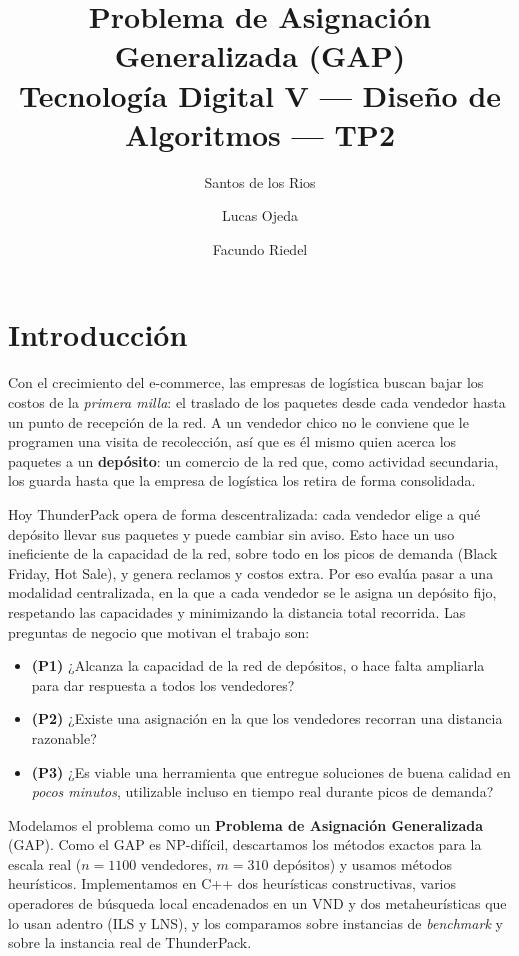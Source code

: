 \documentclass[11pt,a4paper]{article}
\title{\vspace{-1.2cm}\textbf{Problema de Asignación Generalizada (GAP)}\\[6pt]
       \normalsize Tecnología Digital V --- Diseño de Algoritmos --- TP2}
\author{Santos de los Rios \and Lucas Ojeda \and Facundo Riedel}
\date{}
\begin{document}
\maketitle
\vspace{-0.7cm}


\section{Introducción}
Con el crecimiento del e-commerce, las empresas de logística buscan bajar los costos de la
\emph{primera milla}: el traslado de los paquetes desde cada vendedor hasta un punto de recepción
de la red. A un vendedor chico no le conviene que le programen una visita de recolección, así que
es él mismo quien acerca los paquetes a un \textbf{depósito}: un comercio de la red que, como
actividad secundaria, los guarda hasta que la empresa de logística los retira de forma consolidada.

Hoy ThunderPack opera de forma descentralizada: cada vendedor elige a qué depósito llevar sus
paquetes y puede cambiar sin aviso. Esto hace un uso ineficiente de la capacidad de la red,
sobre todo en los picos de demanda (Black Friday, Hot Sale), y genera reclamos y costos extra.
Por eso evalúa pasar a una modalidad centralizada, en la que a cada vendedor se le asigna un
depósito fijo, respetando las capacidades y minimizando la distancia total recorrida. Las
preguntas de negocio que motivan el trabajo son:

\begin{itemize}
  \item \textbf{(P1)} ¿Alcanza la capacidad de la red de depósitos, o hace falta ampliarla
        para dar respuesta a todos los vendedores?
  \item \textbf{(P2)} ¿Existe una asignación en la que los vendedores recorran una distancia
        razonable?
  \item \textbf{(P3)} ¿Es viable una herramienta que entregue soluciones de buena calidad en
        \emph{pocos minutos}, utilizable incluso en tiempo real durante picos de demanda?
\end{itemize}

Modelamos el problema como un \textbf{Problema de Asignación Generalizada} (GAP). Como el GAP
es NP-difícil, descartamos los métodos exactos para la escala real ($n=1100$ vendedores,
$m=310$ depósitos) y usamos métodos heurísticos. Implementamos en C++ dos heurísticas
constructivas, varios operadores de búsqueda local encadenados en un VND y dos metaheurísticas
que lo usan adentro (ILS y LNS), y los comparamos sobre instancias de \emph{benchmark} y sobre
la instancia real de ThunderPack.
\end{document}
